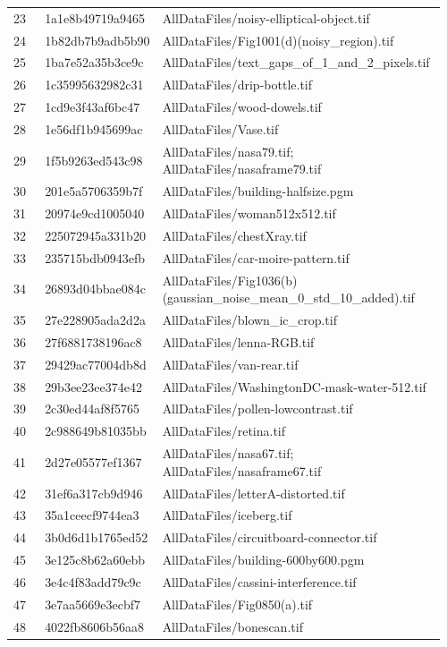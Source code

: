 \documentclass[11pt]{article}
\begin{document}
\begin{longtable}{p{0.08\linewidth}p{0.22\linewidth}p{0.66\linewidth}}
23 & 1a1e8b49719a9465 & AllDataFiles/noisy-elliptical-object.tif \\
24 & 1b82db7b9adb5b90 & AllDataFiles/Fig1001(d)(noisy\_region).tif \\
25 & 1ba7e52a35b3ce9c & AllDataFiles/text\_gaps\_of\_1\_and\_2\_pixels.tif \\
26 & 1c35995632982c31 & AllDataFiles/drip-bottle.tif \\
27 & 1cd9e3f43af6bc47 & AllDataFiles/wood-dowels.tif \\
28 & 1e56df1b945699ac & AllDataFiles/Vase.tif \\
29 & 1f5b9263ed543c98 & AllDataFiles/nasa79.tif; AllDataFiles/nasaframe79.tif \\
30 & 201e5a5706359b7f & AllDataFiles/building-halfsize.pgm \\
31 & 20974e9cd1005040 & AllDataFiles/woman512x512.tif \\
32 & 225072945a331b20 & AllDataFiles/chestXray.tif \\
33 & 235715bdb0943efb & AllDataFiles/car-moire-pattern.tif \\
34 & 26893d04bbae084c & AllDataFiles/Fig1036(b)(gaussian\_noise\_mean\_0\_std\_10\_added).tif \\
35 & 27e228905ada2d2a & AllDataFiles/blown\_ic\_crop.tif \\
36 & 27f6881738196ac8 & AllDataFiles/lenna-RGB.tif \\
37 & 29429ac77004db8d & AllDataFiles/van-rear.tif \\
38 & 29b3ee23ee374e42 & AllDataFiles/WashingtonDC-mask-water-512.tif \\
39 & 2c30ed44af8f5765 & AllDataFiles/pollen-lowcontrast.tif \\
40 & 2c988649b81035bb & AllDataFiles/retina.tif \\
41 & 2d27e05577ef1367 & AllDataFiles/nasa67.tif; AllDataFiles/nasaframe67.tif \\
42 & 31ef6a317cb9d946 & AllDataFiles/letterA-distorted.tif \\
43 & 35a1ceecf9744ea3 & AllDataFiles/iceberg.tif \\
44 & 3b0d6d1b1765ed52 & AllDataFiles/circuitboard-connector.tif \\
45 & 3e125c8b62a60ebb & AllDataFiles/building-600by600.pgm \\
46 & 3e4c4f83add79c9c & AllDataFiles/cassini-interference.tif \\
47 & 3e7aa5669e3ecbf7 & AllDataFiles/Fig0850(a).tif \\
48 & 4022fb8606b56aa8 & AllDataFiles/bonescan.tif \\

\end{longtable}
\end{document}
